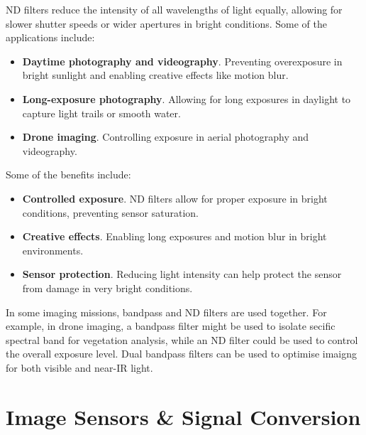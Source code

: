 \documentclass[10pt]{article}
\begin{document}
\begin{multicols}{2}
ND filters reduce the intensity of all wavelengths of light equally, allowing for slower shutter speeds or wider apertures in bright conditions. Some of the applications include:
\begin{itemize}
    \item \textbf{Daytime photography and videography}. Preventing overexposure in bright sunlight and enabling creative effects like motion blur.
    \item \textbf{Long-exposure photography}. Allowing for long exposures in daylight to capture light trails or smooth water.
    \item \textbf{Drone imaging}. Controlling exposure in aerial photography and videography.
\end{itemize}
Some of the benefits include:
\begin{itemize}
    \item \textbf{Controlled exposure}. ND filters allow for proper exposure in bright conditions, preventing sensor saturation.
    \item \textbf{Creative effects}. Enabling long exposures and motion blur in bright environments.
    \item \textbf{Sensor protection}. Reducing light intensity can help protect the sensor from damage in very bright conditions.
\end{itemize}

In some imaging missions, bandpass and ND filters are used together. For example, in drone imaging, a bandpass filter might be used to isolate secific spectral band for vegetation analysis, while an ND filter could be used to control the overall exposure level.
Dual bandpass filters can be used to optimise imaigng for both visible and near-IR light.


\section{Image Sensors \& Signal Conversion}

\end{multicols}
\end{document}
